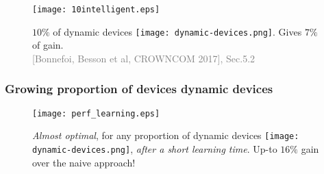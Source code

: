 \begin{frameO}

    \begin{figure}[h!]
        \centering
        \texttt{[image: 10intelligent.eps]}

            $10\%$ of dynamic devices \texttt{[image: dynamic-devices.png]}. Gives $7\%$ of gain.\\
            {\small \textcolor{gray}{[Bonnefoi, Besson et al, CROWNCOM 2017], Sec.5.2}}
    \end{figure}

\end{frameO}









\subsubsection{Growing proportion of devices dynamic devices}

\begin{frameO}[Dependency on \(D/(S+D)\)]

    \begin{figure}[h!]
        \centering
        \texttt{[image: perf\_learning.eps]}

            \emph{Almost optimal}, for any proportion of dynamic devices \texttt{[image: dynamic-devices.png]}, \emph{after a short learning time}. Up-to $16\%$ gain over the naive approach!
    \end{figure}

\end{frameO}


